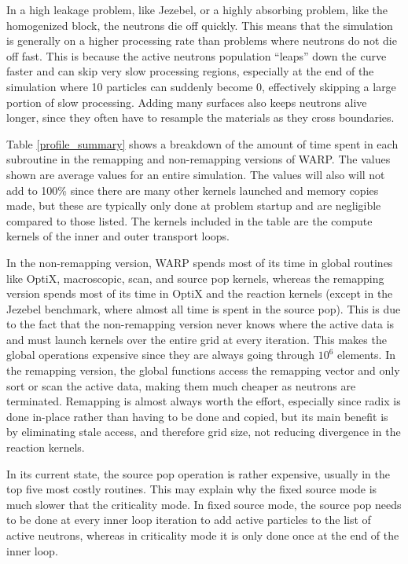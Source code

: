 In a high leakage problem, like Jezebel, or a highly absorbing problem, like the homogenized block, the neutrons die off quickly.  This means that the simulation is generally on a higher processing rate than problems where neutrons do not die off fast.  This is because the active neutrons population ``leaps'' down the curve faster and can skip very slow processing regions, especially at the end of the simulation where 10 particles can suddenly become 0, effectively skipping a large portion of slow processing.  Adding many surfaces also keeps neutrons alive longer, since they often have to resample the materials as they cross boundaries.  

Table \ref{profile_summary} shows a breakdown of the amount of time spent in each subroutine in the remapping and non-remapping versions of WARP.  The values shown are average values for an entire simulation.  The values will also will not add to 100\% since there are many other kernels launched and memory copies made, but these are typically only done at problem startup and are negligible compared to those listed.  The kernels included in the table are the compute kernels of the inner and outer transport loops.  

In the non-remapping version, WARP spends most of its time in global routines like OptiX, macroscopic, scan, and source pop kernels, whereas the remapping version spends most of its time in OptiX and the reaction kernels (except in the Jezebel benchmark, where almost all time is spent in the source pop).  This is due to the fact that the non-remapping version never knows where the active data is and must launch kernels over the entire grid at every iteration.  This makes the global operations expensive since they are always going through $10^6$ elements.  In the remapping version, the global functions access the remapping vector and only sort or scan the active data, making them much cheaper as neutrons are terminated.  Remapping is almost always worth the effort, especially since radix is done in-place rather than having to be done and copied, but its main benefit is by eliminating stale access, and therefore grid size, not reducing divergence in the reaction kernels.

In its current state, the source pop operation is rather expensive, usually in the top five most costly routines.  This may explain why the fixed source mode is much slower that the criticality mode.  In fixed source mode, the source pop needs to be done at every inner loop iteration to add active particles to the list of  active neutrons, whereas in criticality mode it is only done once at the end of the inner loop.



